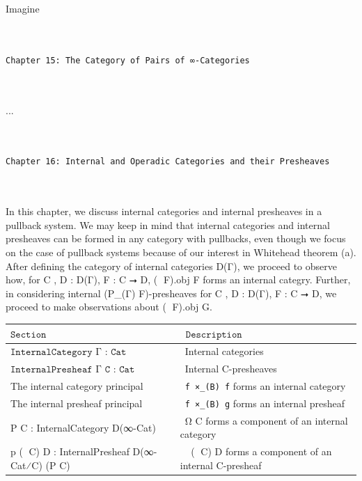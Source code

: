 \documentclass{book}
\theoremstyle{definition}
\renewcommand{\chapter}[1]{
\newpage
{
\Huge 
\begin{center}
\ \\
\ \\
\thispagestyle{empty}
\texttt{#1}
\end{center}}
\ \\
\ \\
}
\begin{document}
Imagine 


\chapter{Chapter 15: The Category of Pairs of ∞-Categories}

...\\


\chapter{Chapter 16: Internal and Operadic Categories and their Presheaves}

In this chapter, we discuss internal categories and internal presheaves in a pullback system. We may keep in mind that internal categories and internal presheaves can be formed in any category with pullbacks, even though we focus on the case of pullback systems because of our interest in Whitehead theorem (a).\\

After defining the category of internal categories D(Γ), we proceed to observe how, for C , D : D(Γ), F : C ⭢ D, (ω⃗ F).obj F forms an internal categry. Further, in considering internal (P⃗\_(Γ) F)-presheaves for  C , D : D(Γ), F : C ⭢ D, we proceed to make observations about (ω⃗ F).obj G.\\

{
\footnotesize
\begin{center}
\begin{tabular}{||l || l ||} 
 \hline
 $\texttt{Section}$  &\ $\texttt{Description}$ \\
 \hline \hline
 $\texttt{InternalCategory Γ : Cat}$   &\ Internal categories \\ 
 \hline
 $\texttt{InternalPresheaf Γ C : Cat}$ &\ Internal C-presheaves \\ 
 \hline
 The internal category principal &\ \texttt{f ×\_(B) f} forms an internal category\\
 \hline
 The internal presheaf principal &\ \texttt{f ×\_(B) g} forms an internal presheaf\\
 \hline
 P⃗ C : InternalCategory D(∞-Cat) &\ Ω⃗ C forms a component of an internal category \\
 \hline
 p⃗ (𝟙 C) D : InternalPresheaf D(∞-Cat⁄C) (P⃗ C) &\ ω⃗ (𝟙 C) D forms a component of an internal C-presheaf \\
 \hline
\end{tabular}
\end{center}
}
\end{document}
